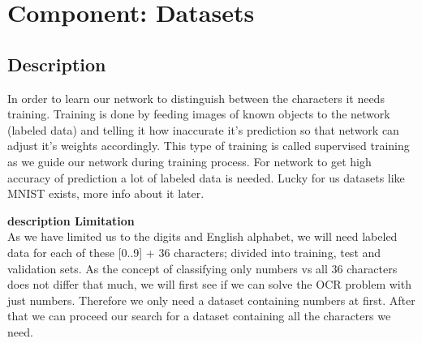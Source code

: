 \documentclass[Report.tex]{subfiles}
\begin{document}
\section{Component: Datasets}
\label{Method:Datasets}


\subsection{Description}

\begin{flushleft}
  In order to learn our network to distinguish between the characters it needs training. Training is done by feeding images of known objects to the network (labeled data) and telling it how inaccurate it's prediction so that network can adjust it's weights accordingly. This type of training is called supervised training as we guide our network during training process.
  For network to get high accuracy of prediction a lot of labeled data is needed. Lucky for us datasets like MNIST exists, more info about it later.
\end{flushleft}

\textbf{description Limitation} \\
As we have limited us to the digits and English alphabet, we will need labeled data for each of these [0..9] + 36 characters; divided into training, test and validation sets. As the concept of classifying only numbers vs all 36 characters does not differ that much, we will first see if we can solve the OCR problem with just numbers. Therefore we only need a dataset containing numbers at first. After that we can proceed our search for a dataset containing all the characters we need. \\

\end{document}
